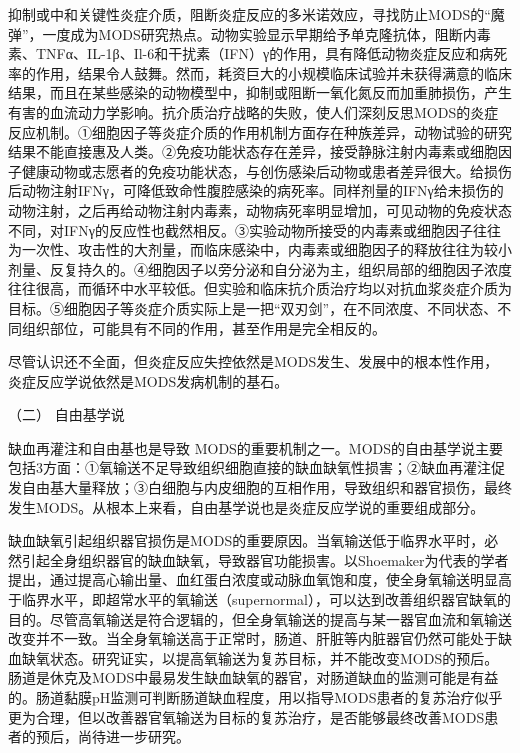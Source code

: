 抑制或中和关键性炎症介质，阻断炎症反应的多米诺效应，寻找防止MODS的“魔弹”，一度成为MODS研究热点。动物实验显示早期给予单克隆抗体，阻断内毒素、TNFα、IL-1β、Il-6和干扰素（IFN）γ的作用，具有降低动物炎症反应和病死率的作用，结果令人鼓舞。然而，耗资巨大的小规模临床试验并未获得满意的临床结果，而且在某些感染的动物模型中，抑制或阻断一氧化氮反而加重肺损伤，产生有害的血流动力学影响。抗介质治疗战略的失败，使人们深刻反思MODS的炎症反应机制。①细胞因子等炎症介质的作用机制方面存在种族差异，动物试验的研究结果不能直接惠及人类。②免疫功能状态存在差异，接受静脉注射内毒素或细胞因子健康动物或志愿者的免疫功能状态，与创伤感染后动物或患者差异很大。给损伤后动物注射IFNγ，可降低致命性腹腔感染的病死率。同样剂量的IFNγ给未损伤的动物注射，之后再给动物注射内毒素，动物病死率明显增加，可见动物的免疫状态不同，对IFNγ的反应性也截然相反。③实验动物所接受的内毒素或细胞因子往往为一次性、攻击性的大剂量，而临床感染中，内毒素或细胞因子的释放往往为较小剂量、反复持久的。④细胞因子以旁分泌和自分泌为主，组织局部的细胞因子浓度往往很高，而循环中水平较低。但实验和临床抗介质治疗均以对抗血浆炎症介质为目标。⑤细胞因子等炎症介质实际上是一把“双刃剑”，在不同浓度、不同状态、不同组织部位，可能具有不同的作用，甚至作用是完全相反的。

尽管认识还不全面，但炎症反应失控依然是MODS发生、发展中的根本性作用，炎症反应学说依然是MODS发病机制的基石。

\hypertarget{text00093.htmlux5cux23CHP3-11-2-2-2}{}
（二） 自由基学说

缺血再灌注和自由基也是导致
MODS的重要机制之一。MODS的自由基学说主要包括3方面：①氧输送不足导致组织细胞直接的缺血缺氧性损害；②缺血再灌注促发自由基大量释放；③白细胞与内皮细胞的互相作用，导致组织和器官损伤，最终发生MODS。从根本上来看，自由基学说也是炎症反应学说的重要组成部分。

缺血缺氧引起组织器官损伤是MODS的重要原因。当氧输送低于临界水平时，必然引起全身组织器官的缺血缺氧，导致器官功能损害。以Shoemaker为代表的学者提出，通过提高心输出量、血红蛋白浓度或动脉血氧饱和度，使全身氧输送明显高于临界水平，即超常水平的氧输送（supernormal），可以达到改善组织器官缺氧的目的。尽管高氧输送是符合逻辑的，但全身氧输送的提高与某一器官血流和氧输送改变并不一致。当全身氧输送高于正常时，肠道、肝脏等内脏器官仍然可能处于缺血缺氧状态。研究证实，以提高氧输送为复苏目标，并不能改变MODS的预后。肠道是休克及MODS中最易发生缺血缺氧的器官，对肠道缺血的监测可能是有益的。肠道黏膜pH监测可判断肠道缺血程度，用以指导MODS患者的复苏治疗似乎更为合理，但以改善器官氧输送为目标的复苏治疗，是否能够最终改善MODS患者的预后，尚待进一步研究。

